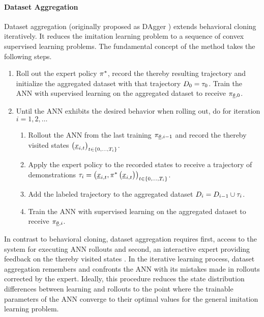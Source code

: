 \paragraph*{Dataset Aggregation}$\ $\\
Dataset aggregation (originally proposed as DAgger \cite{Ross2010}) 
extends behavioral cloning iteratively.
It reduces the imitation learning problem 
to a sequence of convex supervised learning problems.
The fundamental concept of the method takes the following steps.
\begin{enumerate}
    \item 
    Roll out the expert policy $\pi^*$,
    record the thereby resulting trajectory
    and initialize the aggregated dataset with that trajectory
    $D_0 = \tau_0$.
    Train the ANN with supervised learning on the aggregated dataset
    to receive
    $\pi_{\underline{\theta}, 0}$.
    \item Until the ANN exhibits the desired behavior when rolling out, 
    do for iteration $i = 1,2,\dots$
    \begin{enumerate}
        \item Rollout the ANN from the last training
        $\pi_{\underline{\theta}, i-1}$
        and record the thereby visited states
        $\left({\underline{x}_{i,t}}\right)_{t\in \left\{{0, \dots, T_i}\right\}}$.
        \item Apply the expert policy to the recorded states 
        to receive a trajectory of demonstrations
        $\tau_i = \left({\underline{x}_{i,t}, 
    \pi^*\left({\underline{x}_{i,t}}\right)}\right)
    _{t \in \left\{{0, \dots, T_i}\right\}}$.
        \item Add the labeled trajectory to the aggregated dataset
        $D_i = D_{i-1} \cup \tau_i$.
        \item Train the ANN with supervised learning on the aggregated dataset
        to receive
        $\pi_{\underline{\theta}, i}$.
    \end{enumerate}
\end{enumerate}
In contrast to behavioral cloning,
dataset aggregation requires first, 
access to the system for executing ANN rollouts
and second, 
an interactive expert providing feedback 
on the thereby visited states \cite{yue2018imitation}.
In the iterative learning process,
dataset aggregation
remembers and confronts the ANN with
its mistakes made in rollouts corrected by the expert.
Ideally, this procedure reduces the 
state distribution differences between learning and rollouts
to the point where
the trainable parameters of the ANN converge to their
optimal values for the general imitation learning problem.






